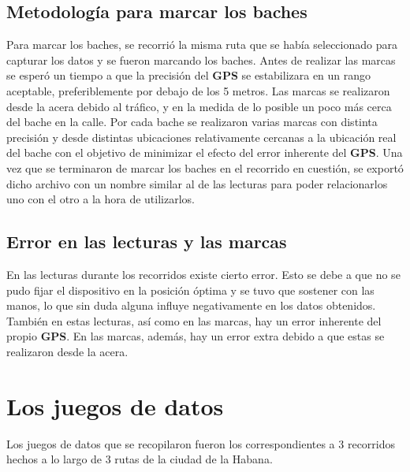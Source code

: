 	\subsection{Metodología para marcar los baches}
		Para marcar los baches, se recorrió la misma ruta que se había seleccionado para capturar los datos y se fueron marcando los baches. Antes 
		de realizar las marcas se esperó un tiempo a que la precisión del \textbf{GPS} se estabilizara en un rango aceptable, preferiblemente por debajo 
		de los 5 metros. Las marcas se realizaron desde la acera debido al tráfico, y en la medida de lo posible un poco más cerca del bache en la calle.
		Por cada bache se realizaron varias marcas con distinta precisión y desde distintas ubicaciones relativamente cercanas a la ubicación real del
		bache con el objetivo de minimizar el efecto del error inherente del \textbf{GPS}. Una vez que se terminaron de marcar los baches en el recorrido
		en cuestión, se exportó dicho archivo con un nombre similar al de las lecturas para poder relacionarlos uno con el otro a la hora de utilizarlos.

	\subsection{Error en las lecturas y las marcas}
		En las lecturas durante los recorridos existe cierto error. Esto se debe a que no se pudo fijar el dispositivo en la posición óptima y se tuvo que
		sostener con las manos, lo que sin duda alguna influye negativamente en los datos obtenidos. También en estas lecturas, así como en las marcas, hay un
		error inherente del propio \textbf{GPS}. En las marcas, además, hay un error extra debido a que estas se realizaron desde la acera.

\section{Los juegos de datos}   
	Los juegos de datos que se recopilaron fueron los correspondientes a 3 recorridos hechos a lo largo de 3 rutas de la ciudad de la Habana.

